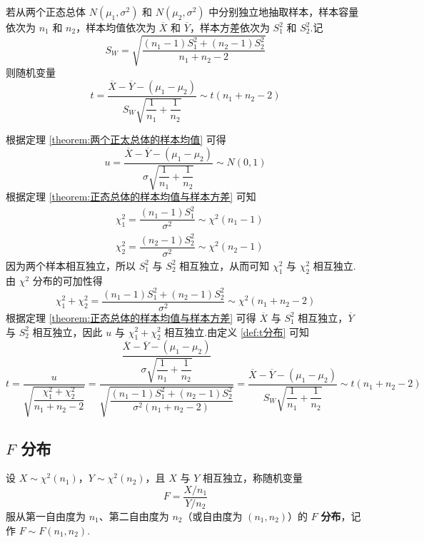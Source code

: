 \begin{theorem}
    若从两个正态总体 $N(\mu_1, \sigma^2)$ 和 $N(\mu_2, \sigma^2)$ 中分别独立地抽取样本，样本容量依次为 $n_1$ 和 $n_2$，样本均值依次为 $\overline{X}$ 和 $\overline{Y}$，样本方差依次为 $S_1^2$ 和 $S_2^2$.记
    $$
    S_W = \sqrt{\dfrac{(n_1 - 1) S_1^2 + (n_2 - 1) S_2^2}{n_1 + n_2 - 2}}
    $$
    则随机变量
    $$
    t = \dfrac{\overline{X} - \overline{Y} - (\mu_1 - \mu_2)}{S_W \sqrt{\dfrac{1}{n_1} + \dfrac{1}{n_2}}} \sim t(n_1 + n_2 - 2)
    $$
\end{theorem}

\begin{myproof}
    根据定理 \ref{theorem:两个正太总体的样本均值} 可得
    $$
    u = \dfrac{\overline{X} - \overline{Y} - (\mu_1 - \mu_2)}{\sigma \sqrt{\dfrac{1}{n_1} + \dfrac{1}{n_2}}} \sim N(0,1)
    $$
    根据定理 \ref{theorem:正态总体的样本均值与样本方差} 可知
    $$
    \begin{aligned}
        & \chi_1^2 = \dfrac{(n_1 - 1) S_1^2}{\sigma^2} \sim \chi^2(n_1 - 1) \\
        & \chi_2^2 = \dfrac{(n_2 - 1) S_2^2}{\sigma^2} \sim \chi^2(n_2 - 1)
    \end{aligned}
    $$
    因为两个样本相互独立，所以 $S_1^2$ 与 $S_2^2$ 相互独立，从而可知 $\chi_1^2$ 与 $\chi_2^2$ 相互独立.由 $\chi^2$ 分布的可加性得
    $$
    \chi_1^2 + \chi_2^2 = \dfrac{(n_1 - 1) S_1^2 + (n_2 - 1) S_2^2}{\sigma^2} \sim \chi^2(n_1 + n_2 - 2)
    $$
    根据定理 \ref{theorem:正态总体的样本均值与样本方差} 可得 $\overline{X}$ 与 $S_1^2$ 相互独立，$\overline{Y}$ 与 $S_2^2$ 相互独立，因此 $u$ 与 $\chi_1^2 + \chi_2^2$ 相互独立.由定义 \ref{def:t分布} 可知
    $$
    t = \dfrac{u}{\sqrt{\dfrac{\chi_1^2 + \chi_2^2}{n_1 + n_2 - 2}}} = \dfrac{\dfrac{\overline{X} - \overline{Y} - (\mu_1 - \mu_2)}{\sigma \sqrt{\dfrac{1}{n_1} + \dfrac{1}{n_2}}}}{\sqrt{\dfrac{(n_1 - 1) S_1^2 + (n_2 - 1) S_2^2}{\sigma^2 (n_1 + n_2 - 2)}}} = \dfrac{\overline{X} - \overline{Y} - (\mu_1 - \mu_2)}{S_W \sqrt{\dfrac{1}{n_1} + \dfrac{1}{n_2}}} \sim t(n_1 + n_2 - 2)
    $$
\end{myproof}

\subsection{\texorpdfstring{$F$}{} 分布}

\begin{definition}
    设 $X \sim \chi^2(n_1)$，$Y \sim \chi^2(n_2)$，且 $X$ 与 $Y$ 相互独立，称随机变量
    $$
    F = \dfrac{X / n_1}{Y / n_2}
    $$
    服从第一自由度为 $n_1$、第二自由度为 $n_2$（或自由度为 $(n_1,n_2)$）的 $F$ \textbf{分布}，记作
    $F \sim F(n_1, n_2)$.
\end{definition}

